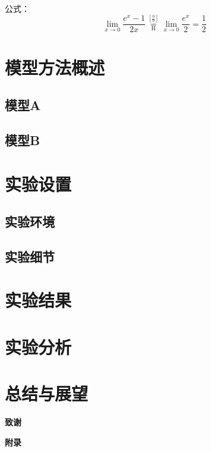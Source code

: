 \documentclass[zihao = -4,cn]{oucart}
\begin{document}
公式\cite{DBLP:journals/corr/DaiHLRS16}：
\begin{equation}
 \lim_{x\to 0}{\frac{e^x-1}{2x}}
 \overset{\left[\frac{0}{0}\right]}{\underset{\mathrm{H}}{=}}
 \lim_{x\to 0}{\frac{e^x}{2}}={\frac{1}{2}}
\end{equation}
\newpage



\section{模型方法概述}
\subsection{模型A}
\subsection{模型B}

\newpage

\section{实验设置}
\subsection{实验环境}
\subsection{实验细节}

\newpage

\section{实验结果}

\newpage

\section{实验分析}
\newpage

\section{总结与展望}

\newpage
%


\newpage


\begin{center}
 \textbf{致谢} \\
\end{center}

\newpage
\begin{center}
 \textbf{附录} \\
\end{center}
\end{document}
